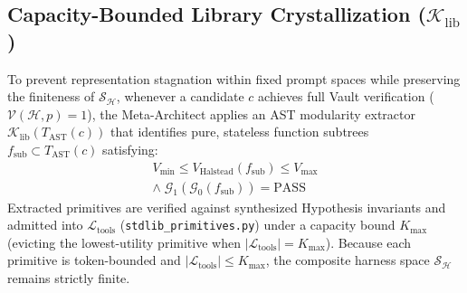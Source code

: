 \documentclass[10pt,twocolumn,letterpaper]{article}
\begin{document}
\subsection{Capacity-Bounded Library Crystallization ($\mathcal{K}_{\text{lib}}$)}
To prevent representation stagnation within fixed prompt spaces while preserving the finiteness of $\mathcal{S}_{\mathcal{H}}$, whenever a candidate $c$ achieves full Vault verification ($\mathcal{V}(\mathcal{H},p)=1$), the Meta-Architect applies an AST modularity extractor $\mathcal{K}_{\text{lib}}(T_{\text{AST}}(c))$ that identifies pure, stateless function subtrees $f_{\text{sub}}\subset T_{\text{AST}}(c)$ satisfying:
\begin{multline}
V_{\min}\le V_{\text{Halstead}}(f_{\text{sub}})\le V_{\max} \\
\wedge\; \mathcal{G}_{1}\!\left(\mathcal{G}_{0}(f_{\text{sub}})\right) = \text{PASS}
\end{multline}
Extracted primitives are verified against synthesized Hypothesis invariants and admitted into $\mathcal{L}_{\text{tools}}$ (\texttt{stdlib\_\allowbreak primitives.py}) under a capacity bound $K_{\max}$ (evicting the lowest-utility primitive when $|\mathcal{L}_{\text{tools}}|=K_{\max}$). Because each primitive is token-bounded and $|\mathcal{L}_{\text{tools}}|\le K_{\max}$, the composite harness space $\mathcal{S}_{\mathcal{H}}$ remains strictly finite.
\end{document}
